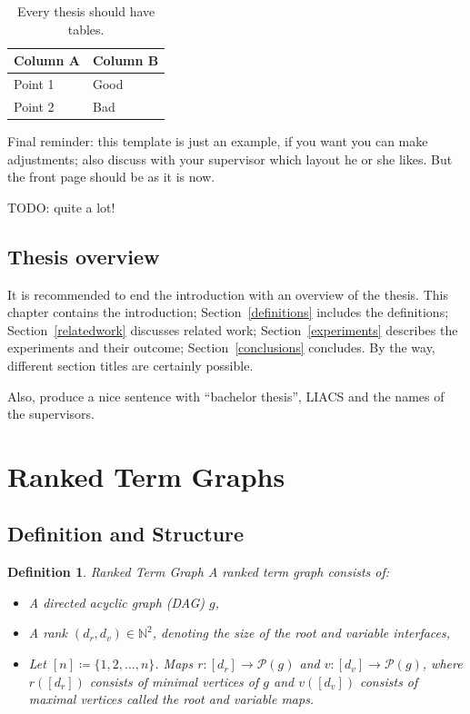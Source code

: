 \documentclass[12pt]{article}
\newtheorem{definition}{Definition}
\newcommand{\1}{\mathbbm{1}}
\begin{document}
\begin{table}[!htbp]
\begin{center}
\begin{tabular}{l|l}
Column A & Column B\\
\hline
Point 1 & Good\\
Point 2 & Bad
\end{tabular}
\end{center}
\caption{Every thesis should have tables.}\label{atable}
\end{table}

Final reminder: this template is just an example, if you want you can make adjustments; also discuss with your supervisor which layout he or she likes. But the front page should be as it is now.

TODO: quite a lot!

\subsection{Thesis overview}
It is recommended to end the introduction with an overview of the thesis. This chapter contains the introduction; Section~\ref{definitions} includes the definitions; Section~\ref{relatedwork} discusses related work; Section~\ref{experiments} describes the experiments and their outcome; Section~\ref{conclusions} concludes. By the way, different section titles are certainly possible.

Also, produce a nice sentence with ``bachelor thesis'', LIACS and the names of the supervisors.
\section{Ranked Term Graphs}

\subsection{Definition and Structure}
\begin{definition}{Ranked Term Graph}
A \emph{ranked term graph} consists of:
\begin{itemize}
\item A directed acyclic graph (DAG) $g$,
\item A \emph{rank} $(d_r, d_v) \in \mathbb{N}^2$, denoting the size of the root and variable interfaces,
\item Let $[n] \coloneqq \{1,2,\dots, n\}$. Maps $r: [d_r] \to \mathcal{P}(g)$ and $v: [d_v] \to \mathcal{P}(g)$, where $r([d_r])$ consists of minimal vertices of $g$ and $v([d_v])$ consists of maximal vertices called the \emph{root} and \emph{variable} maps.
\end{itemize}
\end{definition}
\end{document}
